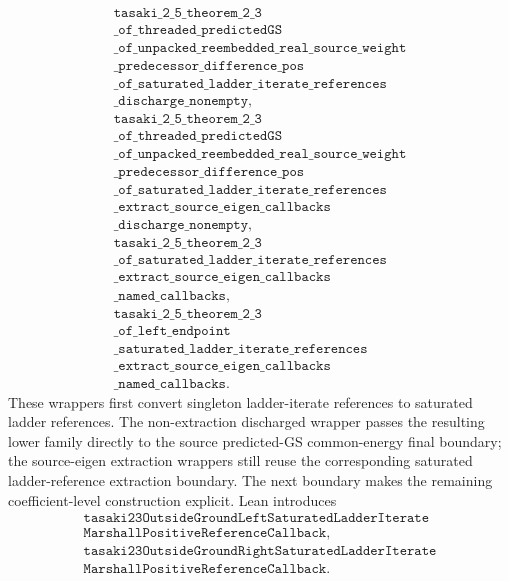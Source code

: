 \documentclass[a4paper,11pt]{article}
\begin{document}
\[
\begin{gathered}
\texttt{tasaki\_2\_5\_theorem\_2\_3}\\
\texttt{\_of\_threaded\_predictedGS}\\
\texttt{\_of\_unpacked\_reembedded\_real\_source\_weight}\\
\texttt{\_predecessor\_difference\_pos}\\
\texttt{\_of\_saturated\_ladder\_iterate\_references}\\
\texttt{\_discharge\_nonempty},\\
\texttt{tasaki\_2\_5\_theorem\_2\_3}\\
\texttt{\_of\_threaded\_predictedGS}\\
\texttt{\_of\_unpacked\_reembedded\_real\_source\_weight}\\
\texttt{\_predecessor\_difference\_pos}\\
\texttt{\_of\_saturated\_ladder\_iterate\_references}\\
\texttt{\_extract\_source\_eigen\_callbacks}\\
\texttt{\_discharge\_nonempty},\\
\texttt{tasaki\_2\_5\_theorem\_2\_3}\\
\texttt{\_of\_saturated\_ladder\_iterate\_references}\\
\texttt{\_extract\_source\_eigen\_callbacks}\\
\texttt{\_named\_callbacks},\\
\texttt{tasaki\_2\_5\_theorem\_2\_3}\\
\texttt{\_of\_left\_endpoint}\\
\texttt{\_saturated\_ladder\_iterate\_references}\\
\texttt{\_extract\_source\_eigen\_callbacks}\\
\texttt{\_named\_callbacks}.
\end{gathered}
\]
These wrappers first convert singleton ladder-iterate references to saturated
ladder references.  The non-extraction discharged wrapper passes the resulting
lower family directly to the source predicted-GS common-energy final boundary;
the source-eigen extraction wrappers still reuse the corresponding saturated
ladder-reference extraction boundary.
The next boundary makes the remaining coefficient-level construction explicit.
Lean introduces
\[
\begin{gathered}
\texttt{tasaki23OutsideGroundLeftSaturatedLadderIterate}\\
\texttt{MarshallPositiveReferenceCallback},\\
\texttt{tasaki23OutsideGroundRightSaturatedLadderIterate}\\
\texttt{MarshallPositiveReferenceCallback}.
\end{gathered}
\]
\end{document}
